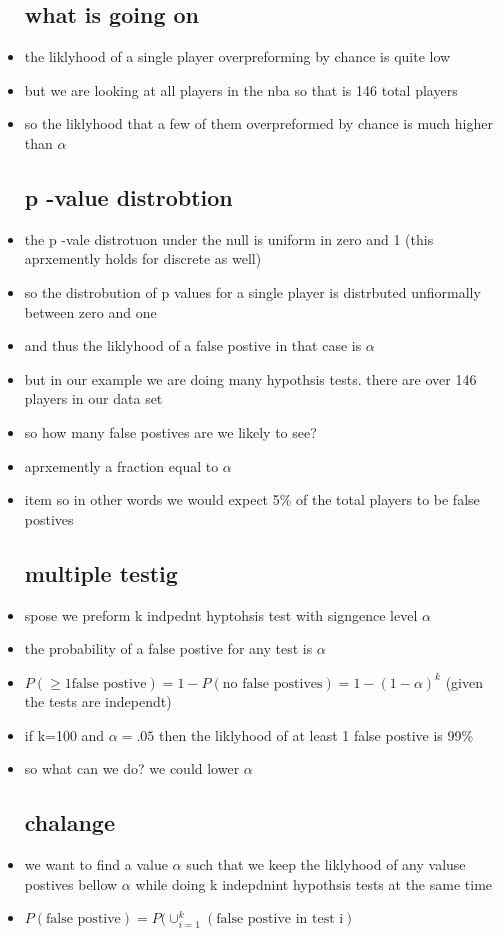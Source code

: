 \documentclass{article}
\begin{document}
\begin{itemize}
\subsection*{what is going on}
\item the liklyhood of a single player overpreforming by chance is quite low 
\item but we are looking at all players in the nba so that is 146 total players
\item so the liklyhood that a few of them overpreformed by chance is much higher than $\alpha$
\subsection*{p -value distrobtion }
\item the p -vale distrotuon under the null is uniform in zero and 1 (this aprxemently holds for discrete as well)
\item so the distrobution of p values for a single player is distrbuted unfiormally between zero and one 
\item and thus the liklyhood of a false postive in that case is $\alpha$
\item but in our example we are doing many hypothsis tests. there are over 146 players in our data set 
\item so how many false postives are we likely to see?
\item aprxemently a fraction equal to $\alpha$
\item item so in other words we would expect 5\% of the total players to be false postives
\subsection*{multiple testig }
\item spose we preform k indpednt hyptohsis test with signgence level $\alpha$
\item the probability of a false postive for any test is $\alpha$
\item $P(\geq 1 \text{false postive})=1-P(\text{no false postives})=1-(1-\alpha)^{k}$ (given the tests are independt)
\item if k=100 and $\alpha=.05$ then the liklyhood of at least 1 false postive is  99\%
\item so what can we do? we could lower $\alpha$
\subsection*{chalange}
\item we want to find a value $\alpha$ such that we keep the liklyhood of any valuse postives bellow $\alpha$ while doing k indepdnint hypothsis tests at the same time 
\item$ P( \text{false postive} )= P( \cup_{i=1}^{k}(\text{false postive in test i})$

\end{itemize}
\end{document}
